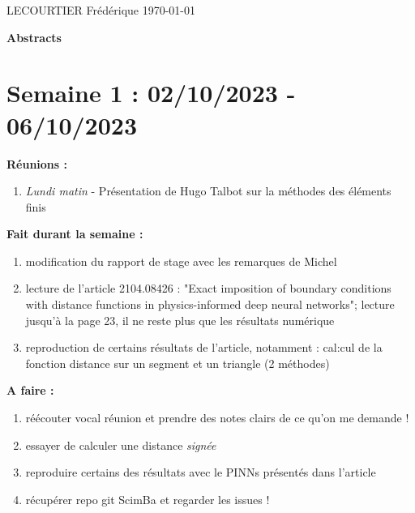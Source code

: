 \documentclass[french]{article}
\begin{document}
	LECOURTIER Frédérique \hfill \today
	\begin{center}
		\Large\textbf{{Abstracts}}
	\end{center}

\section{Semaine 1 : 02/10/2023 - 06/10/2023}
	\textbf{Réunions :}
	\begin{enumerate}[label=\textbullet]
		\item \textit{Lundi matin} -  Présentation de Hugo Talbot sur la méthodes des éléments finis
	\end{enumerate}
	\textbf{Fait durant la semaine :}
	\begin{enumerate}[label=\textbullet]
		\item modification du rapport de stage avec les remarques de Michel
		\item lecture de l'article 2104.08426 : "Exact imposition of boundary conditions with distance functions in physics-informed deep neural networks"; lecture jusqu'à la page 23, il ne reste plus que les résultats numérique
		\item reproduction de certains résultats de l'article, notamment : cal:cul de la fonction distance sur un segment et un triangle (2 méthodes)
	\end{enumerate}

	\textbf{A faire :}
	\begin{enumerate}[label=\textbullet]
		\item réécouter vocal réunion et prendre des notes clairs de ce qu'on me demande !
		\item essayer de calculer une distance \textit{signée}
		\item reproduire certains des résultats avec le PINNs présentés dans l'article
		\item récupérer repo git ScimBa et regarder les issues !
	\end{enumerate}
\end{document}
